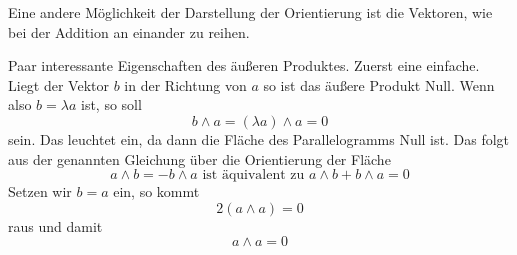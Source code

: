 \documentclass[fleqn]{scrartcl}
\numberwithin{equation}{section}
\begin{document}
Eine andere Möglichkeit der Darstellung der Orientierung ist die Vektoren, wie
bei der Addition an einander zu reihen.
\begin{center}
\begin{minipage}{\linewidth}
\centering
{}
\label{fig:outherProduct2}
\end{minipage}
\end{center}

Paar interessante Eigenschaften des äußeren Produktes. Zuerst eine einfache.
Liegt der Vektor $b$ in der Richtung von $a$ so ist das äußere Produkt Null.
Wenn also $b=\lambda a$ ist, so soll
\[b\wedge a = (\lambda a)\wedge a= 0\]
sein. Das leuchtet ein, da dann die Fläche des Parallelogramms Null ist. Das
folgt aus der genannten Gleichung über die Orientierung der Fläche
\[a\wedge b = - b\wedge a \textrm{ ist äquivalent zu } a\wedge b + b\wedge a = 0\]
Setzen wir $b = a$ ein, so kommt
\[2(a\wedge a)=0\]
raus und damit
\[a\wedge a = 0\]
\end{document}
